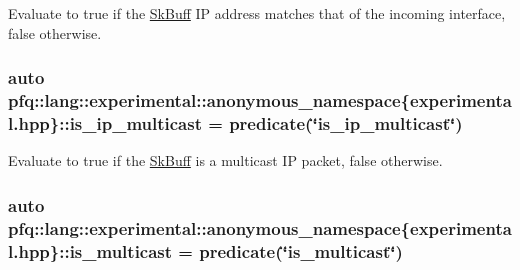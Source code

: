 Evaluate to {\ttfamily true} if the \hyperlink{structpfq_1_1lang_1_1SkBuff}{Sk\+Buff} IP address matches that of the incoming interface, {\ttfamily false} otherwise. 

\subsubsection[{\texorpdfstring{is\+\_\+ip\+\_\+multicast}{is_ip_multicast}}]{\setlength{\rightskip}{0pt plus 5cm}auto pfq\+::lang\+::experimental\+::anonymous\+\_\+namespace\{experimental.\+hpp\}\+::is\+\_\+ip\+\_\+multicast = {\bf predicate}(\char`\"{}is\+\_\+ip\+\_\+multicast\char`\"{})}\hypertarget{namespacepfq_1_1lang_1_1experimental_1_1anonymous__namespace_02experimental_8hpp_03_a6b14037fa990cc066d69c9f491345156}{}\label{namespacepfq_1_1lang_1_1experimental_1_1anonymous__namespace_02experimental_8hpp_03_a6b14037fa990cc066d69c9f491345156}


Evaluate to {\ttfamily true} if the \hyperlink{structpfq_1_1lang_1_1SkBuff}{Sk\+Buff} is a multicast IP packet, {\ttfamily false} otherwise. 

\subsubsection[{\texorpdfstring{is\+\_\+multicast}{is_multicast}}]{\setlength{\rightskip}{0pt plus 5cm}auto pfq\+::lang\+::experimental\+::anonymous\+\_\+namespace\{experimental.\+hpp\}\+::is\+\_\+multicast = {\bf predicate}(\char`\"{}is\+\_\+multicast\char`\"{})}\hypertarget{namespacepfq_1_1lang_1_1experimental_1_1anonymous__namespace_02experimental_8hpp_03_aaec1b91653bd79cedff8912605c7cdf8}{}\label{namespacepfq_1_1lang_1_1experimental_1_1anonymous__namespace_02experimental_8hpp_03_aaec1b91653bd79cedff8912605c7cdf8}


